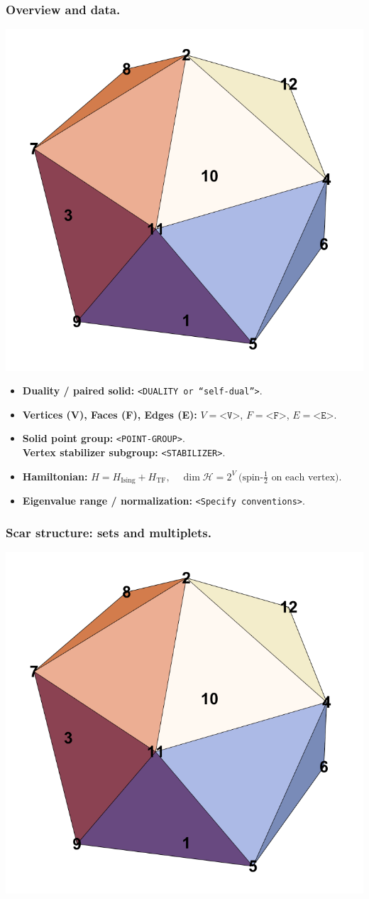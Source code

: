\documentclass[11pt,a4paper]{article}
\newcommand{\Hising}{H_{\mathrm{Ising}}}
\newcommand{\Htf}{H_{\mathrm{TF}}}
\newcommand{\Htot}{H=\Hising+\Htf}
\begin{document}
\subsubsection*{Overview and data.}
\begin{center}
  \includegraphics[width=.6\linewidth]{icosahedron}
\end{center}

\begin{itemize}[leftmargin=1.5em]
  \item \textbf{Duality / paired solid:} \texttt{<DUALITY or “self-dual”>}.
  \item \textbf{Vertices (V), Faces (F), Edges (E):} $V=\texttt{<V>}$,\; $F=\texttt{<F>}$,\; $E=\texttt{<E>}$.
  \item \textbf{Solid point group:} \texttt{<POINT-GROUP>}.\\
        \textbf{Vertex stabilizer subgroup:} \texttt{<STABILIZER>}.
  \item \textbf{Hamiltonian:} \(
        \Htot,\quad
        \dim\mathcal{H} = 2^{V}\ \text{(spin-$\tfrac12$ on each vertex).}
        \)
  \item \textbf{Eigenvalue range / normalization:} \texttt{<Specify conventions>}.
\end{itemize}

\subsubsection*{Scar structure: sets and multiplets.}
\begin{center}
  \includegraphics[width=.6\linewidth]{icosahedron}
\end{center}
\end{document}
